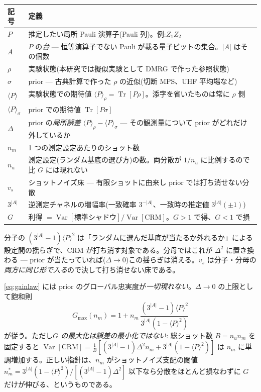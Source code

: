 \documentclass[11pt,a4paper]{ltjsarticle}
\newcommand{\ev}[1]{\langle #1\rangle}
\newcommand{\Tr}{\operatorname{Tr}}
\newcommand{\Var}{\operatorname{Var}}
\begin{document}
\begin{center}\small
\begin{tabular}{@{}ll@{}}
\toprule
記号 & 定義 \\
\midrule
$P$ & 推定したい局所 Pauli 演算子(Pauli 列)。例:$Z_1Z_2$ \\
$A$ & $P$ の\emph{台} --- 恒等演算子でない Pauli が載る量子ビットの集合。$|A|$ はその個数 \\
$\rho$ & 実験状態(本研究では擬似実験として DMRG で作った参照状態) \\
$\sigma$ & prior --- 古典計算で作った $\rho$ の近似(切断 MPS、UHF 平均場など) \\
$\ev{P}$ & 実験状態での期待値 $\ev{P}_\rho=\Tr[P\rho]$。添字を省いたものは常に $\rho$ 側 \\
$\ev{P}_\sigma$ & prior での期待値 $\Tr[P\sigma]$ \\
$\Delta$ & prior の\emph{局所誤差} $\ev{P}_\rho-\ev{P}_\sigma$ --- その観測量について prior がどれだけ外しているか \\
$n_m$ & 1 つの測定設定あたりのショット数 \\
$n_u$ & 測定設定(ランダム基底の選び方)の数。両分散が $1/n_u$ に比例するので比 $G$ には現れない \\
$v_s$ & ショットノイズ床 --- 有限ショットに由来し prior では打ち消せない分散 \\
$3^{|A|}$ & 逆測定チャネルの増幅率(一致確率 $3^{-|A|}$、一致時の推定値 $3^{|A|}(\pm1)$) \\
$G$ & 利得 $=\Var[\text{標準シャドウ}]/\Var[\text{CRM}]$。$G>1$ で得、$G<1$ で損 \\
\bottomrule
\end{tabular}
\end{center}

\noindent 分子の $(3^{|A|}-1)\ev{P}^2$ は「ランダムに選んだ基底が当たるか外れるか」による設定間の揺らぎで、CRM が打ち消す対象である。分母ではこれが $\Delta^2$ に置き換わる --- prior が当たっていれば($\Delta\to0$)この揺らぎは消える。$v_s$ は分子・分母の\emph{両方に同じ形で入る}ので決して打ち消せない床である。

\eqref{eq:gainlaw} には prior のグローバル忠実度が\emph{一切現れない}。$\Delta\to0$ の上限として飽和則
\begin{equation}
  G_{\max}(n_m) = 1 + n_m\,\frac{(3^{|A|}-1)\ev{P}^2}{3^{|A|}(1-\ev{P}^2)}
  \label{eq:saturation}
\end{equation}
が従う。ただし\emph{$G$ の最大化は誤差の最小化ではない}: 総ショット数 $B=n_un_m$ を固定すると $\Var[\text{CRM}]=\frac1B[(3^{|A|}-1)\Delta^2n_m+3^{|A|}(1-\ev{P}^2)]$ は $n_m$ に単調増加する。正しい指針は、$n_m$ がショットノイズ支配の閾値 $n_m^\ast=3^{|A|}(1-\ev{P}^2)/[(3^{|A|}-1)\Delta^2]$ 以下なら分散をほとんど損なわずに $G$ だけが伸びる、というものである。
\end{document}

